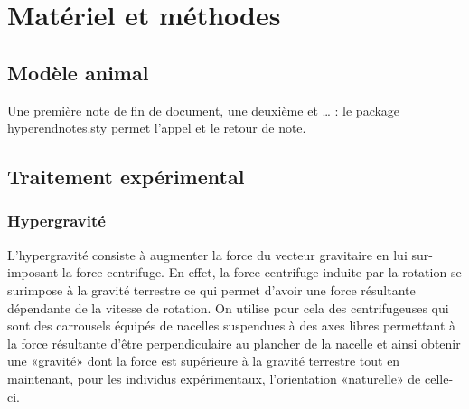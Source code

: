 \section{Matériel et méthodes}
\subsection{Modèle animal}
\lipsum[1]
Une première note de fin de document, une deuxième et \ldots {}      : le package hyperendnotes.sty permet l'appel et le retour de note.
\subsection{Traitement expérimental}
\subsubsection{Hypergravité}
\label{hypergravite} %
L'hypergravité consiste à augmenter la force du vecteur gravitaire en lui sur-imposant la force centrifuge. En effet, la force centrifuge induite par la rotation se surimpose à la gravité terrestre ce qui permet d'avoir une force résultante dépendante de la vitesse de rotation. On utilise pour cela des centrifugeuses qui sont des carrousels équipés de nacelles suspendues à des axes libres permettant à la force résultante d'être perpendiculaire au plancher de la nacelle et ainsi obtenir une «gravité» dont la force est supérieure à la gravité terrestre tout en maintenant, pour les individus expérimentaux, l'orientation «naturelle» de celle-ci. %
